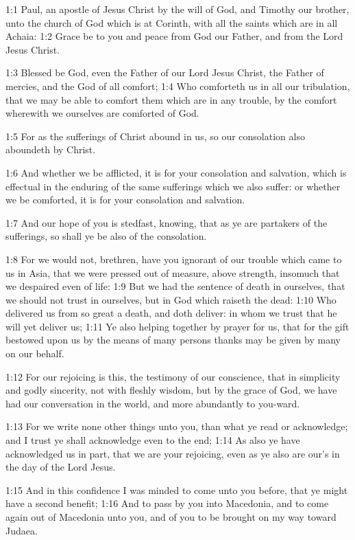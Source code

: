 

1:1 Paul, an apostle of Jesus Christ by the will of God, and Timothy
our brother, unto the church of God which is at Corinth, with all the
saints which are in all Achaia: 1:2 Grace be to you and peace from God
our Father, and from the Lord Jesus Christ.

1:3 Blessed be God, even the Father of our Lord Jesus Christ, the
Father of mercies, and the God of all comfort; 1:4 Who comforteth us
in all our tribulation, that we may be able to comfort them which are
in any trouble, by the comfort wherewith we ourselves are comforted of
God.

1:5 For as the sufferings of Christ abound in us, so our consolation
also aboundeth by Christ.

1:6 And whether we be afflicted, it is for your consolation and
salvation, which is effectual in the enduring of the same sufferings
which we also suffer: or whether we be comforted, it is for your
consolation and salvation.

1:7 And our hope of you is stedfast, knowing, that as ye are partakers
of the sufferings, so shall ye be also of the consolation.

1:8 For we would not, brethren, have you ignorant of our trouble which
came to us in Asia, that we were pressed out of measure, above
strength, insomuch that we despaired even of life: 1:9 But we had the
sentence of death in ourselves, that we should not trust in ourselves,
but in God which raiseth the dead: 1:10 Who delivered us from so great
a death, and doth deliver: in whom we trust that he will yet deliver
us; 1:11 Ye also helping together by prayer for us, that for the gift
bestowed upon us by the means of many persons thanks may be given by
many on our behalf.

1:12 For our rejoicing is this, the testimony of our conscience, that
in simplicity and godly sincerity, not with fleshly wisdom, but by the
grace of God, we have had our conversation in the world, and more
abundantly to you-ward.

1:13 For we write none other things unto you, than what ye read or
acknowledge; and I trust ye shall acknowledge even to the end; 1:14 As
also ye have acknowledged us in part, that we are your rejoicing, even
as ye also are our's in the day of the Lord Jesus.

1:15 And in this confidence I was minded to come unto you before, that
ye might have a second benefit; 1:16 And to pass by you into
Macedonia, and to come again out of Macedonia unto you, and of you to
be brought on my way toward Judaea.

